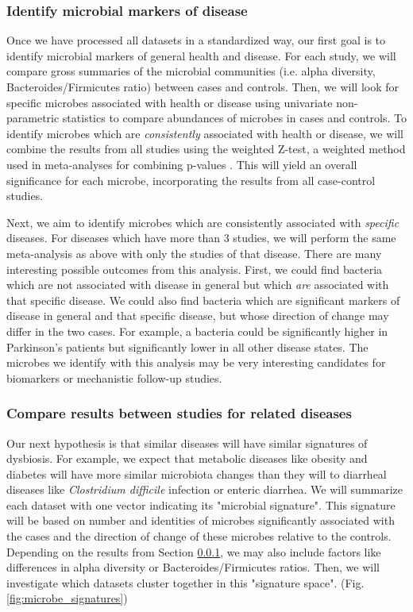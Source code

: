 \documentclass[12pt]{article}
\begin{document}
\subsubsection{Identify microbial markers of disease}\label{sec:indep_studies}
Once we have processed all datasets in a standardized way, our first 
goal is to identify microbial markers of general health and disease. 
For each study, we will compare gross summaries of the microbial communities
(i.e. alpha diversity, Bacteroides/Firmicutes ratio) between cases and controls.
Then, we will look for specific microbes associated with health or disease using
univariate non-parametric statistics to compare abundances of microbes in cases
and controls. To identify microbes which are \textit{consistently} associated with
health or disease, we will combine the results from all studies using 
the weighted Z-test, a weighted method used in meta-analyses for combining p-values \cite{zavkin-ztest-2011}. 
This will yield an overall significance for each microbe,
incorporating the results from all case-control studies.

Next, we aim to identify microbes which are consistently associated with \textit{specific}
diseases. For diseases which have more than 3 studies, we will
perform the same meta-analysis as above with only the studies
of that disease. There are many interesting possible outcomes from this analysis.
First, we could find bacteria which are not associated with disease in general 
but which \textit{are} associated with that specific disease. 
We could also find bacteria which are significant markers of disease in general and 
that specific disease, but whose direction of change may differ in the two cases.
For example, a bacteria could be significantly higher in Parkinson's patients but
significantly lower in all other disease states. The microbes we identify with this
analysis may be very interesting candidates for biomarkers or mechanistic follow-up studies.

\subsubsection{Compare results between studies for related diseases}\label{sec:signatures}
Our next hypothesis is that similar diseases will have similar 
signatures of dysbiosis. For example, we expect that metabolic 
diseases like obesity and diabetes will have more similar microbiota 
changes than they will to diarrheal diseases like \textit{Clostridium 
difficile} infection or enteric diarrhea. We will summarize each 
dataset with one vector indicating its "microbial signature". This 
signature will be based on number and identities of microbes 
significantly associated with the cases and the direction of change 
of these microbes relative to the controls. Depending on the results from Section 
\ref{sec:indep_studies}, we may also include factors like differences 
in alpha diversity or Bacteroides/Firmicutes ratios. Then, we will 
investigate which datasets cluster together in this "signature space". 
(Fig. \ref{fig:microbe_signatures})
\end{document}
